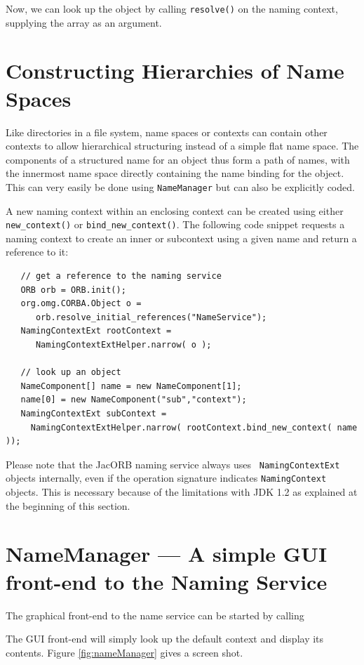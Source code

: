Now,  we can  look up  the object  by calling  {\tt resolve()}  on the
naming context, supplying the array as an argument.

\section{Constructing Hierarchies of Name Spaces}

Like directories in a file system, name spaces or contexts can contain
other contexts  to allow hierarchical structuring instead  of a simple
flat name  space. The  components of a  structured name for  an object
thus  form a path  of names,  with the  innermost name  space directly
containing the  name binding for the  object. This can  very easily be
done using {\tt NameManager} but can also be explicitly coded.

A new naming context within  an enclosing context can be created using
either   {\tt  new\_context()}   or  {\tt   bind\_new\_context()}.  The
following code snippet requests a naming context to create an inner or
subcontext using a given name and return a reference to it:
\small{\begin{verbatim}
   // get a reference to the naming service
   ORB orb = ORB.init();
   org.omg.CORBA.Object o =
      orb.resolve_initial_references("NameService");
   NamingContextExt rootContext =
      NamingContextExtHelper.narrow( o );

   // look up an object
   NameComponent[] name = new NameComponent[1];
   name[0] = new NameComponent("sub","context");
   NamingContextExt subContext =
     NamingContextExtHelper.narrow( rootContext.bind_new_context( name ));
\end{verbatim}}

Please  note   that  the  JacORB  naming  service   always  uses  {\tt
NamingContextExt} objects internally,  even if the operation signature
indicates {\tt  NamingContext} objects.  This is  necessary because of
the limitations  with JDK  1.2 as explained  at the beginning  of this
section.

\section{NameManager --- A simple GUI front-end to the Naming Service}

The graphical front-end to the name service can be started by calling


The GUI front-end will simply look up the default context and display
its contents. Figure \ref{fig:nameManager} gives a screen shot.

